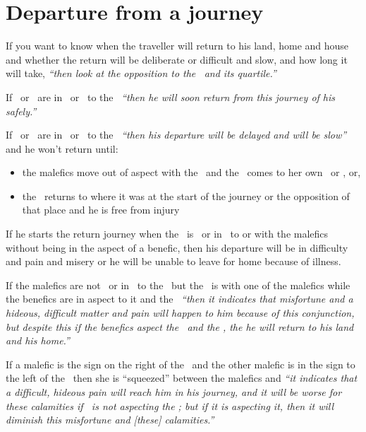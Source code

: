 \section{Departure from a journey}
If you want to know when the traveller will return to his land, home and house and whether the return will be deliberate or difficult and slow, and how long it will take, \textsl{``then look at the opposition to the \Sun\, and its quartile.''}

If \Jupiter\, or \Venus\, are in \Square\ or \Opposition\, to the \Sun\, \textsl{``then he will soon return from this journey of his safely.''}

If \Saturn\, or \Mars\, are in \Square\, or \Opposition\, to the \Sun\, \textsl{``then his departure will be delayed and will be slow''} and he won't return until:
\begin{itemize}[topsep=0em,itemsep=0em]
\item the malefics move out of aspect with the \Moon\, and the \Moon\, comes to her own \Square\, or \Opposition, or,
\item the \Sun\, returns to where it was at the start of the journey or the opposition of that place and he is free from injury
\end{itemize}

If he starts the return journey when the \Moon\, is \Square\, or in \Opposition\, to or with the malefics without being in the aspect of a benefic, then his departure will be in difficulty and pain and misery or he will be unable to leave for home because of illness.

If the malefics are not \Square\, or in \Opposition\, to the \Moon\, but the \Moon\, is with one of the malefics while the benefics are in aspect to it and the \Sun\, \textsl{``then it indicates that misfortune and a hideous, difficult matter and pain will happen to him because of this conjunction, but despite this if the benefics aspect the \Sun\, and the \Moon, the he will return to his land and his home.''}

If a malefic is the sign on the right of the \Moon\, and the other malefic is in the sign to the left of the \Moon\, then she is ``squeezed'' between the malefics and \textsl{``it indicates that a difficult, hideous pain will reach him in his journey, and it will be worse for these calamities if \Jupiter\, is not aspecting the \Moon; but if it is aspecting it, then it will diminish this misfortune and [these] calamities.''}



